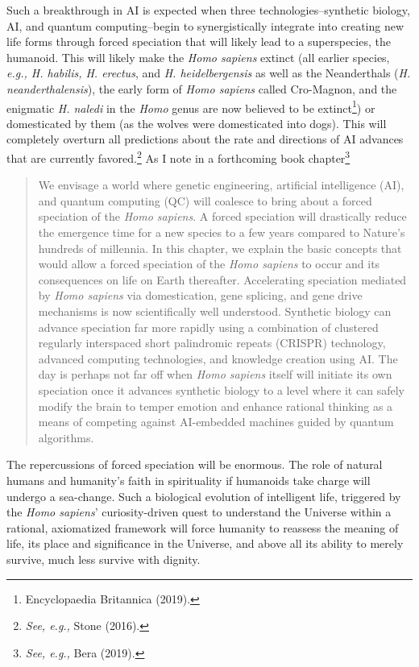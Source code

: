 \begin{multicols}{2}
Such a breakthrough in AI is expected when three technologies--synthetic biology, AI, and quantum computing--begin to synergistically integrate into creating new life forms through forced speciation that will likely lead to a superspecies, the humanoid. This will likely make the \textit{Homo sapiens} extinct (all earlier species, \textit{e.g., H. habilis, H. erectus}, and \textit{H. heidelbergensis} as well as the Neanderthals (\textit{H. neanderthalensis}), the early form of \textit{Homo sapiens} called Cro-Magnon, and the enigmatic \textit{H. naledi} in the \textit{Homo} genus are now believed to be extinct\footnote{Encyclopaedia Britannica (2019).}) or domesticated by them (as the wolves were domesticated into dogs). This will completely overturn all predictions about the rate and directions of AI advances that are currently favored.\footnote{\textit{See, e.g.,} Stone (2016).} As I note in a forthcoming book chapter\footnote{\textit{See, e.g.,} Bera (2019).}
\begin{quote}
We envisage a world where genetic engineering, artificial intelligence (AI), and quantum computing (QC) will coalesce to bring about a forced speciation of the \textit{Homo sapiens}. A forced speciation will drastically reduce the emergence time for a new species to a few years compared to Nature's hundreds of millennia. In this chapter, we explain the basic concepts that would allow a forced speciation of the \textit{Homo sapiens} to occur and its consequences on life on Earth thereafter. Accelerating speciation mediated by \textit{Homo sapiens} via domestication, gene splicing, and gene drive mechanisms is now scientifically well understood. Synthetic biology can advance speciation far more rapidly using a combination of clustered regularly interspaced short palindromic repeats (CRISPR) technology, advanced computing technologies, and knowledge creation using AI. The day is perhaps not far off when \textit{Homo sapiens} itself will initiate its own speciation once it advances synthetic biology to a level where it can safely modify the brain to temper emotion and enhance rational thinking as a means of competing against AI-embedded machines guided by quantum algorithms. 
\end{quote}

The repercussions of forced speciation will be enormous. The role of natural humans and humanity's faith in spirituality if humanoids take charge will undergo a sea-change. Such a biological evolution of intelligent life, triggered by the \textit{Homo sapiens}' curiosity-driven quest to understand the Universe within a rational, axiomatized framework will force humanity to reassess the meaning of life, its place and significance in the Universe, and above all its ability to merely survive, much less survive with dignity. 


\end{multicols}
